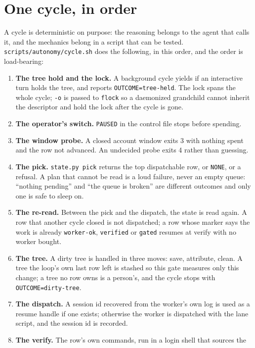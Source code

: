 \section{One cycle, in order}

A cycle is deterministic on purpose: the reasoning belongs to the agent that calls it, and the
mechanics belong in a script that can be tested. \texttt{scripts/autonomy/cycle.sh} does the
following, in this order, and the order is load-bearing:

\begin{enumerate}
	\item \textbf{The tree hold and the lock.} A background cycle yields if an interactive turn
	holds the tree, and reports \texttt{OUTCOME=tree-held}. The lock spans the whole cycle;
	\texttt{-o} is passed to \texttt{flock} so a daemonized grandchild cannot inherit the
	descriptor and hold the lock after the cycle is gone.
	\item \textbf{The operator's switch.} \texttt{PAUSED} in the control file stops before
	spending.
	\item \textbf{The window probe.} A closed account window exits 3 with nothing spent and the
	row not advanced. An undecided probe exits 4 rather than guessing.
	\item \textbf{The pick.} \texttt{state.py pick} returns the top dispatchable row, or
	\texttt{NONE}, or a refusal. A plan that cannot be read is a loud failure, never an empty
	queue: ``nothing pending'' and ``the queue is broken'' are different outcomes and only one
	is safe to sleep on.
	\item \textbf{The re-read.} Between the pick and the dispatch, the state is read again. A
	row that another cycle closed is not dispatched; a row whose marker says the work is
	already \texttt{worker-ok}, \texttt{verified} or \texttt{gated} resumes at verify with no
	worker bought.
	\item \textbf{The tree.} A dirty tree is handled in three moves: save, attribute, clean. A
	tree the loop's own last row left is stashed so this gate measures only this change; a tree
	no row owns is a person's, and the cycle stops with \texttt{OUTCOME=dirty-tree}.
	\item \textbf{The dispatch.} A session id recovered from the worker's own log is used as a
	resume handle if one exists; otherwise the worker is dispatched with the lane script, and
	the session id is recorded.
	\item \textbf{The verify.} The row's own commands, run in a login shell that sources the

\end{enumerate}
